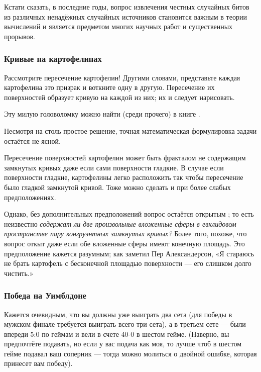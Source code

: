 Кстати сказать, в последние годы, вопрос извлечения честных случайных битов из различных ненадёжных случайных источников становится важным в теории вычислений и является предметом многих научных работ и существенных прорывов.

\subsubsection*{Кривые на картофелинах}

Рассмотрите пересечение картофелин!
Другими словами, представьте каждая картофелина это призрак и воткните одну в другую.
Пересечение их поверхностей образует кривую на каждой из них; их и следует нарисовать.

Эту милую головоломку можно найти (среди прочего) в книге \cite{berlekamp-rodgers}.

\begin{addedbytheeditors}
Несмотря на столь простое решение, точная математическая формулировка задачи остаётся не ясной.

Пересечение поверхностей картофелин может быть фракталом не содержащим замкнутых кривых даже если сами поверхности гладкие.
В случае если поверхности гладкие, картофелины легко расположить так чтобы пересечение было гладкой замкнутой кривой.
Тоже можно сделать и при более слабых предположениях.

Однако, без дополнительных предположений вопрос остаётся открытым \cite{agol};
то есть неизвестно \emph{содержат ли две произвольные вложенные сферы в евклидовом пространстве пару конгруэнтных замкнутых кривых?} 
Более того, похоже, что вопрос откыт даже если обе вложенные сферы имеют конечную площадь.
Это предположение кажется разумным; как заметил Пер Александерсон,
«Я стараюсь не брать картофель с бесконечной площадью поверхности --- его слишком долго чистить.»
\end{addedbytheeditors}

\subsubsection*{Победа на Уимблдоне}

Кажется очевидным, что вы должны уже выиграть два сета (для победы в
мужском финале требуется
выиграть всего три сета), а в третьем сете --- были впереди 5:0 по
геймам и вели в счете 40-0 в шестом гейме.
(Наверно, вы предпочтёте подавать, но если у вас подача как моя, то лучше чтоб в шестом гейме подавал ваш соперник --- тогда можно молиться о двойной ошибке, которая принесет вам победу).

